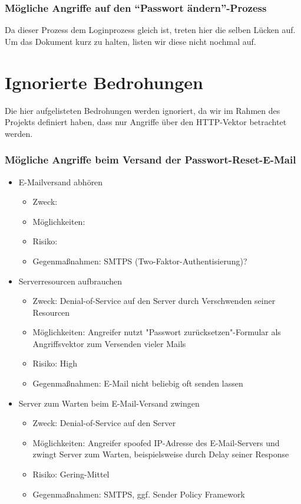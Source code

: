 \documentclass[12pt,DIV14,BCOR10mm,a4paper,parskip=half-,headsepline,headinclude,english,ngerman,bibliography=totocnumbered]{scrreprt}
\begin{document}
\subsubsection{Mögliche Angriffe auf den \enquote{Passwort ändern}-Prozess}

Da dieser Prozess dem Loginprozess gleich ist, treten hier die selben Lücken auf.
Um das Dokument kurz zu halten, listen wir diese nicht nochmal auf.

\section{Ignorierte Bedrohungen}

Die hier aufgelisteten Bedrohungen werden ignoriert, da wir im Rahmen des Projekts definiert haben, dass nur Angriffe über den HTTP-Vektor betrachtet werden.

\subsubsection{Mögliche Angriffe beim Versand der Passwort-Reset-E-Mail}

\begin{itemize}
  \item E-Mailversand abhören
    \begin{itemize}
    \item Zweck:
    \item Möglichkeiten:
    \item Risiko:
    \item Gegenmaßnahmen: SMTPS (Two-Faktor-Authentisierung)?
    \end{itemize}

  \item Serverresourcen aufbrauchen
    \begin{itemize}
    \item Zweck: Denial-of-Service auf den Server durch Verschwenden seiner Resourcen
    \item Möglichkeiten: Angreifer nutzt "Passwort zurücksetzen"-Formular als Angriffsvektor zum Versenden vieler Mails
    \item Risiko: High
    \item Gegenmaßnahmen: E-Mail nicht beliebig oft senden lassen
    \end{itemize}

  \item Server zum Warten beim E-Mail-Versand zwingen
    \begin{itemize}
    \item Zweck: Denial-of-Service auf den Server
    \item Möglichkeiten: Angreifer spoofed IP-Adresse des E-Mail-Servers und zwingt Server zum Warten, beispielsweise durch Delay seiner Response
    \item Risiko: Gering-Mittel
    \item Gegenmaßnahmen: SMTPS, ggf. Sender Policy Framework
    \end{itemize}
\end{itemize}
\end{document}
